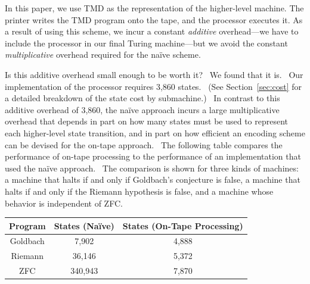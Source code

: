 \documentclass[11pt]{article}
\newcommand{\statenum}{7,870 }
\newcommand{\gbstatenum}{4,888 }
\newcommand{\rmstatenum}{5,372 }
\begin{document}
In this paper, we use TMD as the representation of the higher-level machine.\footnotemark
{}
The printer writes the TMD program onto the tape, and the processor executes it. As a result of using this scheme, we incur a constant \emph{additive} overhead---we have to include the processor in our final Turing machine---but we avoid the constant \emph{multiplicative} overhead required for the na\"ive scheme.

Is this additive overhead small enough to be worth it? \ We found that it is. \ Our implementation of the processor requires 3,860 states. \ (See Section~\ref{sec:cost} for a detailed breakdown of the state cost by submachine.) \ In contrast to this additive overhead of 3,860, the na\"ive approach incurs a large multiplicative overhead that depends in part on how many states must be used to represent each higher-level state transition, and in part on how efficient an encoding scheme can be devised for the on-tape approach. \ The following table compares the performance of on-tape processing to the performance of an implementation that used the na\"ive approach. \ The comparison is shown for three kinds of machines: a machine that halts if and only if Goldbach's conjecture is false, a machine that halts if and only if the Riemann hypothesis is false, and a machine whose behavior is independent of ZFC.

\begin{center}
    \begin{tabular}{||c c c||}
    \hline
    Program & States (Na\"ive) & States (On-Tape Processing) \\ [0.5ex]
    \hline
    Goldbach & 7,902 & \gbstatenum\\
    \hline
    Riemann & 36,146 & \rmstatenum\\
    \hline
    ZFC & 340,943 & \statenum\\
    \hline
    \end{tabular}
\end{center}
\end{document}
